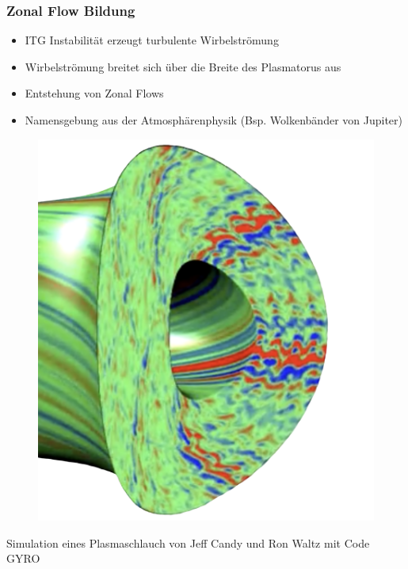\documentclass[compress,aspectratio=169]{beamer}
\begin{document}
	\begin{frame}
		\frametitle{Zonal Flow Bildung}
		\begin{minipage}{0.6\textwidth}\raggedleft
			\centering
			\begin{itemize}
				\item ITG Instabilität erzeugt turbulente Wirbelströmung
				\item Wirbelströmung breitet sich über die Breite des Plasmatorus aus
				\item Entstehung von \alert{Zonal Flows}
				\item Namensgebung aus der Atmosphärenphysik (Bsp. Wolkenbänder von Jupiter)
			\end{itemize}
		\end{minipage}
		\begin{minipage}{0.3\textwidth}
			\begin{figure}%
				\href{https://www.youtube.com/watch?v=O6tUHzfj-zM}{\includegraphics[width=\textwidth]{pictures/turbulence.png}}
			\end{figure}
			{\tiny Simulation eines Plasmaschlauch von Jeff Candy und Ron Waltz mit Code GYRO}
		\end{minipage}
	\end{frame}
\end{document}
